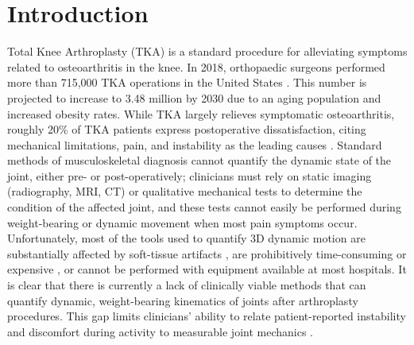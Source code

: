 \chapter{Introduction}
Total Knee Arthroplasty (TKA) is a standard procedure for alleviating symptoms related to osteoarthritis in the knee.
In 2018, orthopaedic surgeons performed more than 715,000 TKA operations in the United States \cite{agencyforhealthcareresearchandqualityHCUPFastStats}.
This number is projected to increase to 3.48 million by 2030 \cite{kurtzProjectionsPrimaryRevision2007} due to an aging population and increased obesity rates.
While TKA largely relieves symptomatic osteoarthritis, roughly 20\% of TKA patients express postoperative dissatisfaction, citing mechanical limitations, pain, and instability as the leading causes \cite{bakerRolePainFunction2007,bournePatientSatisfactionTotal2010,scottPredictingDissatisfactionFollowing2010}.
Standard methods of musculoskeletal diagnosis cannot quantify the dynamic state of the joint, either pre- or post-operatively; clinicians must rely on static imaging (radiography, MRI, CT) or qualitative mechanical tests to determine the condition of the affected joint, and these tests cannot easily be performed during weight-bearing or dynamic movement when most pain symptoms occur.
Unfortunately, most of the tools used to quantify 3D dynamic motion are substantially affected by soft-tissue artifacts \cite{gaoInvestigationSoftTissue2008,stagniQuantificationSoftTissue2005,linEffectsSoftTissue2016}, are prohibitively time-consuming or expensive \cite{daemsValidationThreedimensionalTotal2016}, or cannot be performed with equipment available at most hospitals.
It is clear that there is currently a lack of clinically viable methods that can quantify dynamic, weight-bearing kinematics of joints after arthroplasty procedures.
This gap limits clinicians' ability to relate patient-reported instability and discomfort during activity to measurable joint mechanics \cite{banksWhatPostoperativeOutcome2017}.

